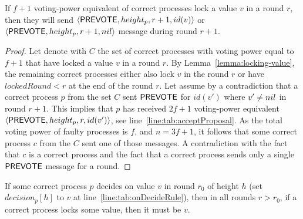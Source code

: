 \begin{lemma}
	\label{lemma:vote-for-locked-value}
	If $f+1$ voting-power equivalent of correct processes lock a value $v$ in a round $r$, then they will send $\langle\mathsf{PREVOTE},height_p, r+1, id(v)\rangle$ or  $\langle\mathsf{PREVOTE},height_p, r+1, nil\rangle$ message during round $r+1$.
\end{lemma}

\begin{proof}
Let denote with $C$ the set of correct processes with voting power equal to $f+1$ that have locked a value $v$ in a round $r$. By Lemma~\ref{lemma:locking-value}, the remaining correct processes either also lock $v$ in the round $r$ or have $lockedRound < r$ at the end of the round $r$. Let assume by a contradiction that a correct process $p$ from the set $C$ sent $\mathsf{PREVOTE}$ for $id(v')$ where $v' \neq nil$ in round $r+1$. This implies that $p$ has received $2f+1$ voting-power equivalent $\langle\mathsf{PREVOTE},height_p,r,id(v')\rangle$, see line~\ref{line:tab:acceptProposal}. As the total voting power of faulty processes is $f$, and $n=3f+1$, it follows that some correct process $c$ from the $C$ sent one of those messages. A contradiction with the fact that $c$ is a  correct process and the fact that a correct process sends only a single $\mathsf{PREVOTE}$ message for a round. 
\end{proof}

\begin{lemma}
	\label{lemma:locked-decision_value}
If some correct process $p$ decides on value $v$ in round $r_0$ of height $h$ (set $decision_p[h]$ to $v$ at line~\ref{line:tab:onDecideRule}), then in all rounds $r > r_0$, if a correct process locks some value, then it must be $v$. 
\end{lemma}

